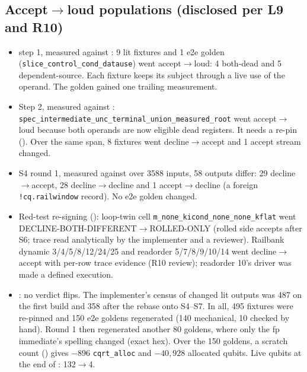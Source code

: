 \subsection*{Accept$\to$loud populations (disclosed per L9 and R10)}
\begin{itemize}[itemsep=1pt]
\item {} step 1, measured against : 9 lit fixtures and 1 e2e golden (\texttt{slice\_control\_cond\_datause}) went accept$\to$loud: 4 both-dead and 5 dependent-source. Each fixture keeps its subject through a live use of the operand. The golden gained one trailing measurement.
\item Step 2, measured against : \texttt{spec\_intermediate\_unc\_terminal\_union\_measured\_root} went accept$\to$loud because both operands are now eligible dead registers. It needs a re-pin (). Over the same span, 8 fixtures went decline$\to$accept and 1 accept stream changed.
\item S4 round 1, measured against  over 3588 inputs, 58 outputs differ: 29 decline$\to$accept, 28 decline$\to$decline and 1 accept$\to$decline (a foreign \texttt{!cq.railwindow} record). No e2e golden changed.
\item Red-test re-signing (): loop-twin cell \texttt{m\_none\_kicond\_none\_none\_kflat} went DECLINE-BOTH-DIFFERENT$\to$ROLLED-ONLY (rolled side accepts after S6; trace read analytically by the implementer and a reviewer). Railbank dynamic 3/4/5/8/12/24/25 and readorder 5/7/8/9/10/14 went decline$\to$accept with per-row trace evidence (R10 review); readorder 10's driver was made a defined execution.
\item {}: no verdict flips. The implementer's census of changed lit outputs was 487 on the first build and 358 after the rebase onto S4--S7. In all, 495 fixtures were re-pinned and 150 e2e goldens regenerated (140 mechanical, 10 checked by hand). Round 1 then regenerated another 80 goldens, where only the fp immediate's spelling changed (exact hex). Over the 150 goldens, a scratch count () gives $-896$ \texttt{cqrt\_alloc} and $-40{,}928$ allocated qubits. Live qubits at the end of : 132$\to$4.
\end{itemize}

